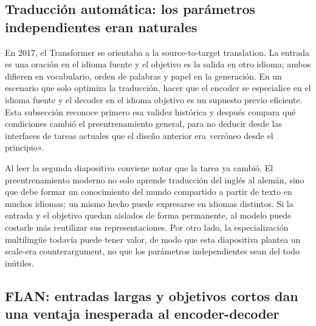 \subsection{Traducción automática: los parámetros independientes eran naturales}

En 2017, el Transformer se orientaba a la source-to-target translation. La entrada es una oración en el idioma fuente y el objetivo es la salida en otro idioma; ambos difieren en vocabulario, orden de palabras y papel en la generación. En un escenario que solo optimiza la traducción, hacer que el encoder se especialice en el idioma fuente y el decoder en el idioma objetivo es un supuesto previo eficiente. Esta subsección reconoce primero esa validez histórica y después compara qué condiciones cambió el preentrenamiento general, para no deducir desde las interfaces de tareas actuales que el diseño anterior era «erróneo desde el principio».



Al leer la segunda diapositiva conviene notar que la tarea ya cambió. El preentrenamiento moderno no solo aprende traducción del inglés al alemán, sino que debe formar un conocimiento del mundo compartido a partir de texto en muchos idiomas; un mismo hecho puede expresarse en idiomas distintos. Si la entrada y el objetivo quedan aislados de forma permanente, al modelo puede costarle más reutilizar sus representaciones. Por otro lado, la especialización multilingüe todavía puede tener valor, de modo que esta diapositiva plantea un scale-era counterargument, no que los parámetros independientes sean del todo inútiles.


\subsection{FLAN: entradas largas y objetivos cortos dan una ventaja inesperada al encoder-decoder}

